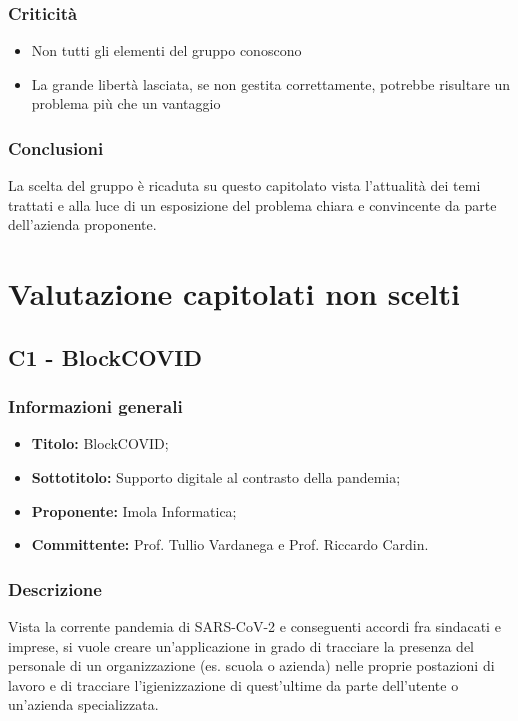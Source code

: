 \documentclass[]{article}
\begin{document}
			\subsubsection{Criticità}
			\begin{itemize}
				\item Non tutti gli elementi del gruppo conoscono 
				\item La grande libertà lasciata, se non gestita correttamente, potrebbe risultare un problema più che un vantaggio
			\end{itemize}
							
			\subsubsection{Conclusioni}
				La scelta del gruppo è ricaduta su questo capitolato vista l'attualità dei temi trattati e alla luce di un esposizione del problema chiara e convincente da parte dell'azienda proponente.
	\newpage

	\section{Valutazione capitolati non scelti}
		\subsection{C1 - BlockCOVID}
			\subsubsection{Informazioni generali}
			\begin{itemize}
				\item \textbf{Titolo:} BlockCOVID;
				\item \textbf{Sottotitolo:} Supporto digitale al contrasto della pandemia;
				\item \textbf{Proponente:} Imola Informatica;
				\item \textbf{Committente:} Prof. Tullio Vardanega e Prof. Riccardo Cardin.
			\end{itemize}

			\subsubsection{Descrizione}
			Vista la corrente pandemia di SARS-CoV-2 e conseguenti accordi fra sindacati e imprese, si vuole creare un'applicazione in grado di tracciare la presenza del personale di un organizzazione (es. scuola o azienda) nelle proprie postazioni di lavoro e di tracciare l'igienizzazione di quest'ultime da parte dell'utente o un'azienda specializzata.
\end{document}
